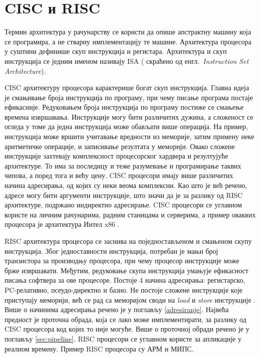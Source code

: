 \documentclass[12pt,oneside]{memoir}
\begin{document}
\section{CISC и RISC}
\label{ciscrisc}
Термин архитектура у рачунарству се користи да опише апстрактну машину која се програмира, а не стварну имплементацију те машине. Архитектура процесора у суштини дефинише скуп инструкција и регистара. Архитектура и скуп инструкција се једним именом називају ISA ( скраћено од енгл.~\textit{Instruction Set Architecture})\cite{isa}.

CISC архитектуру процесора карактерише богат скуп инструкција. Главна идеја је смањивање броја инструкција по програму, при чему писање програма постаје ефикасније. Редуковањем броја инструкција по програму постиже се смањење времена извршавања. Инструкције могу бити различитих дужина, а сложеност се огледа у томе да једна инструкција може обављати више операција. На пример, инструкција може вршити учитавање вредности из меморије, затим примену неке аритметичке операције, и записивање резултата у меморији. Овако сложене инструкције захтевају комплексност процесорског хардвера и резултујуће архитектуре. То има за последицу и теже разумевање и програмирање таквих чипова, а поред тога и већу цену. 
CISC процесори имају више различитих начина адресирања, од којих су неки веома комплексни. Као што је већ речено, адресе могу бити аргументи инструкције, што значи да је за разлику од RISC архитектуре, подржано индиректно адресирање.
CISC процесори се углавном користе на личним рачунарима, радним станицама и серверима, а пример оваквих процесора је архитектура Интел x86 \cite{mips, risc_vs_cisc}.

RISC архитектура процесора се заснива на поједностављеном и смањеном скупу инструкција. Због једноставности инструкција, потребан је мањи број транзистора за производњу процесора, при чему процесор инструкције може брже извршавати. Међутим, редуковање скупа инструкција умањује ефикасност писања софтвера за ове процесоре. 
Постоје 4 начина адресирања: регистарско, PC-релативно, псеудо-директно и базно. Не постоје сложене инструкције које приступају меморији, већ се рад са меморијом своди на \textit{load} и \textit{store} инструкције \cite{mips, risc_vs_cisc}. Више о начинима адресирања речено је у поглављу \ref{adresiranje}.
Највећа предност је проточна обрада, која се лако може имплементирати, за разлику од CISC процесора код којих то није могуће. Више о проточној обради речено је у поглављу \ref{sec:pipeline}. RISC процесори се углавном користе за апликације у реалном времену. Пример RISC процесора су АРМ и МИПС.
\end{document}
